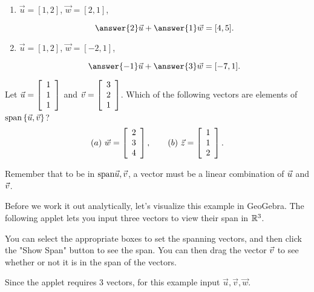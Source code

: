 \documentclass{ximera}
\begin{document}
\begin{exploration}
\begin{example}
\begin{enumerate}
    \item $\vec{u}=[1,2]$, $\vec{w}=[2,1]$, 
    
    $$\answer{2}\vec{u}+\answer{1}\vec{w}=[4,5].$$

    \item $\vec{u}=[1,2]$, $\vec{w}=[-2,1]$,
    
    $$\answer{-1}\vec{u}+\answer{3}\vec{w}=[-7,1].$$

  \end{enumerate}

\end{example}

\begin{example}

  Let $\vect{u}=\startmat{r} 1 \\ 1 \\ 1 \stopmat$ and
  $\vect{v}=\startmat{r} 3 \\ 2 \\ 1 \stopmat$. Which
  of the following vectors are elements of
  $\sspan\set{\vect{u},\vect{v}}$?
  \begin{equation*}
    (a)\quad\vect{w} = \startmat{r} 2 \\ 3 \\ 4 \stopmat,
    \qquad
    (b)\quad\vect{z} = \startmat{r} 1 \\ 1 \\ 2 \stopmat.
  \end{equation*}

  \begin{hint}
  
    Remember that to be in $\sspan{\vect{u},\vect{v}}$, a vector must be a linear combination of $\vect{u}$ and $\vect{v}$.

  \end{hint}

  \begin{solution}

  Before we work it out analytically, let's visualize this example in GeoGebra. The following applet lets you input three vectors to view their span in $\R^3$.

  You can select the appropriate boxes to set the spanning vectors, and then click the "Show Span" button to see the span. You can then drag the vector $\vect{v}$ to see whether or not it is in the span of the vectors.

  Since the applet requires 3 vectors, for this example input $\vec{u}, \vec{v}, \vec{w}$. 


\end{solution}
\end{example}
\end{exploration}
\end{document}
